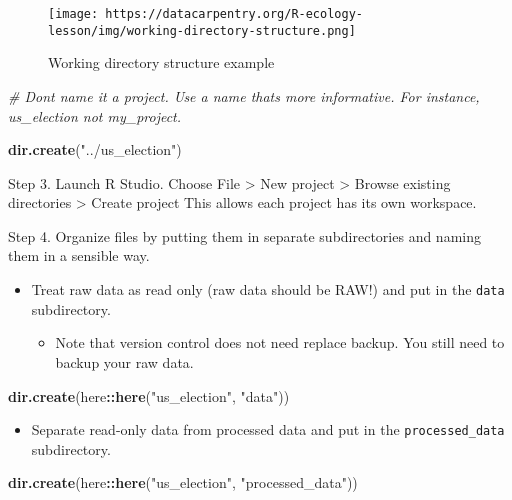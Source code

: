 \documentclass[
]{book}
\newenvironment{Shaded}{\begin{snugshade}}{\end{snugshade}}
\newcommand{\CommentTok}[1]{\textcolor[rgb]{0.56,0.35,0.01}{\textit{#1}}}
\newcommand{\KeywordTok}[1]{\textcolor[rgb]{0.13,0.29,0.53}{\textbf{#1}}}
\newcommand{\NormalTok}[1]{#1}
\newcommand{\OperatorTok}[1]{\textcolor[rgb]{0.81,0.36,0.00}{\textbf{#1}}}
\newcommand{\StringTok}[1]{\textcolor[rgb]{0.31,0.60,0.02}{#1}}
\providecommand{\tightlist}{%
  \setlength{\itemsep}{0pt}\setlength{\parskip}{0pt}}
\begin{document}
\begin{figure}
\centering
\texttt{[image: https://datacarpentry.org/R-ecology-lesson/img/working-directory-structure.png]}
\caption{Working directory structure example}
\end{figure}

\begin{Shaded}
\begin{Highlighting}[]
\CommentTok{\# Don\textquotesingle{}t name it a project. Use a name that\textquotesingle{}s more informative. For instance, us\_election not my\_project.}

\KeywordTok{dir.create}\NormalTok{(}\StringTok{"../us\_election"}\NormalTok{)}
\end{Highlighting}
\end{Shaded}

Step 3. Launch R Studio. Choose File \textgreater{} New project \textgreater{} Browse existing directories \textgreater{} Create project This allows each project has its own workspace.

Step 4. Organize files by putting them in separate subdirectories and naming them in a sensible way.

\begin{itemize}
\item
  Treat raw data as read only (raw data should be RAW!) and put in the \texttt{data} subdirectory.

  \begin{itemize}
  \tightlist
  \item
    Note that version control does not need replace backup. You still need to backup your raw data.
  \end{itemize}
\end{itemize}

\begin{Shaded}
\begin{Highlighting}[]
\KeywordTok{dir.create}\NormalTok{(here}\OperatorTok{::}\KeywordTok{here}\NormalTok{(}\StringTok{"us\_election"}\NormalTok{, }\StringTok{"data"}\NormalTok{))}
\end{Highlighting}
\end{Shaded}

\begin{itemize}
\tightlist
\item
  Separate read-only data from processed data and put in the \texttt{processed\_data} subdirectory.
\end{itemize}

\begin{Shaded}
\begin{Highlighting}[]
\KeywordTok{dir.create}\NormalTok{(here}\OperatorTok{::}\KeywordTok{here}\NormalTok{(}\StringTok{"us\_election"}\NormalTok{, }\StringTok{"processed\_data"}\NormalTok{))}
\end{Highlighting}
\end{Shaded}
\end{document}

